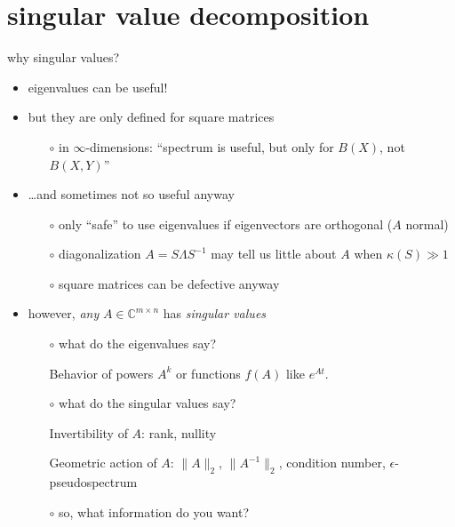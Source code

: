 \documentclass[10pt,hyperref]{beamer}
\newcommand{\CC}{\mathbb{C}}
\newcommand{\eps}{\epsilon}
\begin{document}
\section{singular value decomposition}

\begin{frame}{why singular values?}

\begin{itemize}
\item eigenvalues can be useful!
\item but they are only defined for square matrices
    \begin{itemize}
    \item[$\circ$] in $\infty$-dimensions: ``spectrum is useful, but only for $B(X)$, not $B(X,Y)$''
    \end{itemize}
\item \dots and sometimes not so useful anyway
    \begin{itemize}
    \item[$\circ$] only ``safe'' to use eigenvalues if eigenvectors are orthogonal ($A$ normal)
    \item[$\circ$] diagonalization $A=S\Lambda S^{-1}$ may tell us little about $A$ when $\kappa(S)\gg 1$
    \item[$\circ$] square matrices can be defective anyway
    \end{itemize}
\item however, \emph{any} $A \in \CC^{m\times n}$ has \emph{singular values}
    \begin{itemize}

\medskip
    \item[$\circ$] what do the \alert{eigenvalues} say?

\medskip
    Behavior of powers $A^k$ or functions $f(A)$ like $e^{At}$.

\medskip
    \item[$\circ$] what do the \alert{singular values} say?

\medskip
Invertibility of $A$: rank, nullity

\medskip
Geometric action of $A$: $\|A\|_2$, $\|A^{-1}\|_2$, condition number, $\eps$-pseudospectrum

\medskip
    \item[$\circ$] so, what information do you want?
    \end{itemize}
\end{itemize}
\end{frame}
\end{document}
